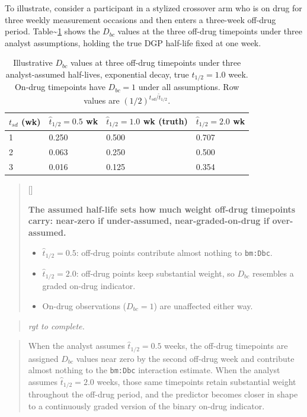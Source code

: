 \documentclass[
  11pt,
]{article}
\newcounter{pgraph}
\newenvironment{bullets}{%
  \stepcounter{pgraph}%
  \begin{quote}\small\sffamily\color[gray]{0.30}%
  {\normalfont\scriptsize\color[gray]{0.58}[\thepgraph]\enspace}}{%
  \end{quote}}
\newenvironment{rgt}{%
  \begin{quote}\small\itshape\color[RGB]{20,60,160}}{%
  \end{quote}}
\newenvironment{orig}{%
  \begin{quote}\normalsize\color[gray]{0.55}}{%
  \end{quote}}
\begin{document}
To illustrate, consider a participant in a stylized crossover
arm who is on drug for three weekly measurement occasions and
then enters a three-week off-drug period. Table\textasciitilde\ref{tab:toy-dbc}
shows the \(D_{bc}\) values at the three off-drug timepoints
under three analyst assumptions, holding the true DGP
half-life fixed at one week.

\begin{table}

\caption{\label{tab:toy-dbc}Illustrative $D_{bc}$ values at three off-drug timepoints under three analyst-assumed half-lives, exponential decay, true $t_{1/2} = 1.0$ week. On-drug timepoints have $D_{bc} = 1$ under all assumptions. Row values are $(1/2)^{t_{sd}/\hat{t}_{1/2}}$.}
\centering
\begin{tabular}[t]{llll}
\toprule
$t_{sd}$ (wk) & $\hat{t}_{1/2} = 0.5$ wk & $\hat{t}_{1/2} = 1.0$ wk (truth) & $\hat{t}_{1/2} = 2.0$ wk\\
\midrule
1 & 0.250 & 0.500 & 0.707\\
2 & 0.063 & 0.250 & 0.500\\
3 & 0.016 & 0.125 & 0.354\\
\bottomrule
\end{tabular}
\end{table}

\begin{bullets}

\textbf{The assumed half-life sets how much weight off-drug
timepoints carry: near-zero if under-assumed, near-graded-on-drug
if over-assumed.}

\begin{itemize}\setlength{\itemsep}{2pt}\setlength{\parskip}{0pt}
\item $\hat{t}_{1/2} = 0.5$: off-drug points contribute almost
nothing to \texttt{bm:Dbc}.
\item $\hat{t}_{1/2} = 2.0$: off-drug points keep substantial
weight, so $D_{bc}$ resembles a graded on-drug indicator.
\item On-drug observations ($D_{bc} = 1$) are unaffected either way.
\end{itemize}

\end{bullets}

\begin{rgt}
rgt to complete.

\end{rgt}

\begin{orig}
When the analyst assumes \(\hat{t}_{1/2} = 0.5\) weeks, the
off-drug timepoints are assigned \(D_{bc}\) values near zero by
the second off-drug week and contribute almost nothing to the
\texttt{bm:Dbc} interaction estimate. When the analyst assumes
\(\hat{t}_{1/2} = 2.0\) weeks, those same timepoints retain
substantial weight throughout the off-drug period, and the predictor
becomes closer in shape to a continuously graded version of the
binary on-drug indicator.

\end{orig}
\end{document}
